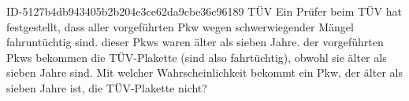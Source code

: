 \begin{exercise}
      {ID-5127b4db943405b2b204e3ce62da9cbe36c96189}
      {TÜV}
  \ifproblem\problem
    Ein Prüfer beim TÜV hat festgestellt, dass  aller vorgeführten Pkw
    wegen schwerwiegender Mängel fahruntüchtig sind.  dieser Pkws waren
    älter als sieben Jahre.  der vorgeführten Pkws bekommen die
    TÜV-Plakette (sind also fahrtüchtig), obwohl sie älter als sieben Jahre
    sind. Mit welcher Wahrscheinlichkeit bekommt ein Pkw, der älter als sieben
    Jahre ist, die TÜV-Plakette nicht?
  \fi
\end{exercise}
